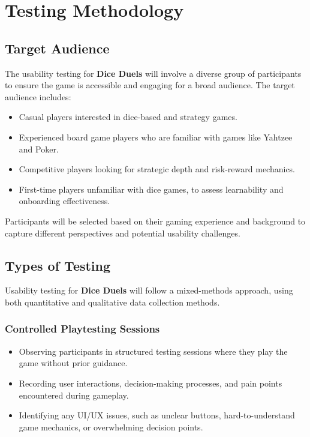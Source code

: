 \documentclass[12pt, titlepage]{article}
\begin{document}
\section{Testing Methodology}

\subsection{Target Audience}
The usability testing for \textbf{Dice Duels} will involve a diverse group of participants to ensure the game is accessible and engaging for a broad audience. The target audience includes:
\begin{itemize}
    \item Casual players interested in dice-based and strategy games.
    \item Experienced board game players who are familiar with games like Yahtzee and Poker.
    \item Competitive players looking for strategic depth and risk-reward mechanics.
    \item First-time players unfamiliar with dice games, to assess learnability and onboarding effectiveness.
\end{itemize}
Participants will be selected based on their gaming experience and background to capture different perspectives and potential usability challenges.

\subsection{Types of Testing}
Usability testing for \textbf{Dice Duels} will follow a mixed-methods approach, using both quantitative and qualitative data collection methods.

\subsubsection{Controlled Playtesting Sessions}
\begin{itemize}
    \item Observing participants in structured testing sessions where they play the game without prior guidance.
    \item Recording user interactions, decision-making processes, and pain points encountered during gameplay.
    \item Identifying any UI/UX issues, such as unclear buttons, hard-to-understand game mechanics, or overwhelming decision points.
\end{itemize}
\end{document}
